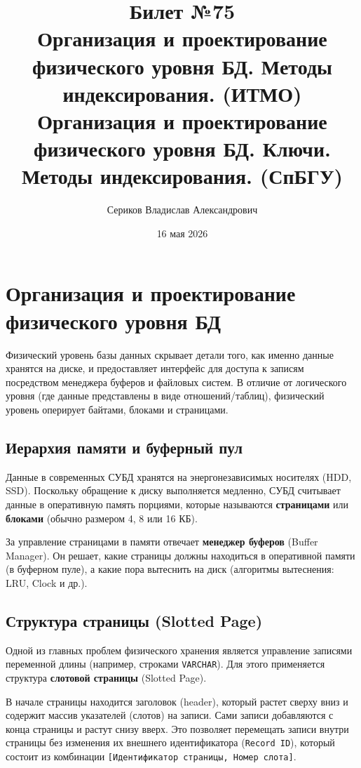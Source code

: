 \documentclass[12pt, a4paper]{article}
\title{Билет №75 \\ \small Организация и проектирование физического уровня БД. Методы индексирования. (ИТМО) \\ Организация и проектирование физического уровня БД. Ключи. Методы индексирования. (СпБГУ)}
\author{Сериков Владислав Александрович}
\date{16 мая 2026}
\begin{document}
\maketitle
\tableofcontents
\newpage

\section{Организация и проектирование физического уровня БД}

Физический уровень базы данных скрывает детали того, как именно данные хранятся на диске, и предоставляет интерфейс для доступа к записям посредством менеджера буферов и файловых систем. В отличие от логического уровня (где данные представлены в виде отношений/таблиц), физический уровень оперирует байтами, блоками и страницами.

\subsection{Иерархия памяти и буферный пул}
Данные в современных СУБД хранятся на энергонезависимых носителях (HDD, SSD). Поскольку обращение к диску выполняется медленно, СУБД считывает данные в оперативную память порциями, которые называются \textbf{страницами} или \textbf{блоками} (обычно размером 4, 8 или 16 КБ).

За управление страницами в памяти отвечает \textbf{менеджер буферов} (Buffer Manager). Он решает, какие страницы должны находиться в оперативной памяти (в буферном пуле), а какие пора вытеснить на диск (алгоритмы вытеснения: LRU, Clock и др.).

\subsection{Структура страницы (Slotted Page)}
Одной из главных проблем физического хранения является управление записями переменной длины (например, строками \texttt{VARCHAR}). Для этого применяется структура \textbf{слотовой страницы} (Slotted Page).

В начале страницы находится заголовок (header), который растет сверху вниз и содержит массив указателей (слотов) на записи. Сами записи добавляются с конца страницы и растут снизу вверх. Это позволяет перемещать записи внутри страницы без изменения их внешнего идентификатора (\texttt{Record ID}), который состоит из комбинации \texttt{[Идентификатор страницы, Номер слота]}.
\end{document}
